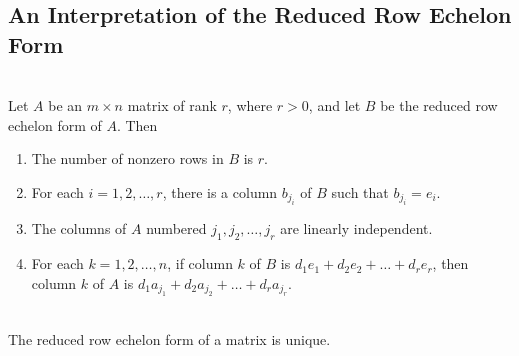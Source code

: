 \subsection*{An Interpretation of the Reduced Row Echelon Form}

\begin{theorem}
	\hfill\\
	Let $A$ be an $m \times n$ matrix of rank $r$, where $r > 0$, and let $B$ be the reduced row echelon form of $A$. Then

	\begin{enumerate}
		\item The number of nonzero rows in $B$ is $r$.
		\item For each $i = 1, 2, \dots, r$, there is a column $b_{j_i}$ of $B$ such that $b_{j_i} = e_i$.
		\item The columns of $A$ numbered $j_1, j_2, \dots, j_r$ are linearly independent.
		\item For each $k = 1, 2, \dots, n$, if column $k$ of $B$ is $d_1e_1+d_2e_2+\dots+d_re_r$, then column $k$ of $A$ is $d_1a_{j_1} + d_2a_{j_2} + \dots + d_ra_{j_r}$.
	\end{enumerate}
\end{theorem}

\begin{corollary}
	\hfill\\
	The reduced row echelon form of a matrix is unique.
\end{corollary}
